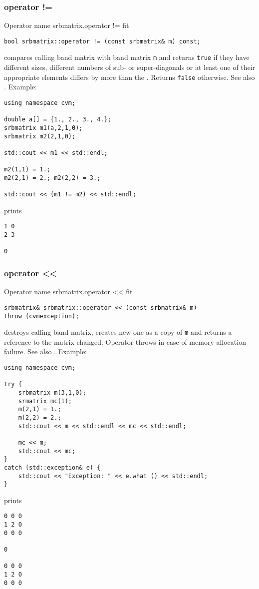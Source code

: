 \subsubsection{operator !=}
Operator%
\pdfdest name {srbmatrix.operator !=} fit
\begin{verbatim}
bool srbmatrix::operator != (const srbmatrix& m) const;
\end{verbatim}
compares  calling band matrix with  band matrix \verb"m"
and returns \verb"true" if they have different sizes,
different numbers of sub- or super-diagonals
or at least one of their appropriate elements
differs by more than the
.
Returns \verb"false" otherwise.
See also .
Example:
\begin{Verbatim}
using namespace cvm;

double a[] = {1., 2., 3., 4.};
srbmatrix m1(a,2,1,0);
srbmatrix m2(2,1,0);

std::cout << m1 << std::endl;

m2(1,1) = 1.; 
m2(2,1) = 2.; m2(2,2) = 3.;

std::cout << (m1 != m2) << std::endl;
\end{Verbatim}
prints
\begin{Verbatim}
1 0
2 3

0
\end{Verbatim}
\newpage




\subsubsection{operator <{}<}
Operator%
\pdfdest name {srbmatrix.operator <<} fit
\begin{verbatim}
srbmatrix& srbmatrix::operator << (const srbmatrix& m)
throw (cvmexception);
\end{verbatim}
destroys  calling band matrix, creates  new one as a copy of \verb"m"
and returns a reference to
the matrix changed.
Operator throws  
in case of memory allocation failure.
See also .
Example:
\begin{Verbatim}
using namespace cvm;

try {
    srbmatrix m(3,1,0);
    srmatrix mc(1);
    m(2,1) = 1.;
    m(2,2) = 2.;
    std::cout << m << std::endl << mc << std::endl;

    mc << m;
    std::cout << mc;
}
catch (std::exception& e) {
    std::cout << "Exception: " << e.what () << std::endl;
}
\end{Verbatim}
prints
\begin{Verbatim}
0 0 0
1 2 0
0 0 0

0

0 0 0
1 2 0
0 0 0
\end{Verbatim}
\newpage




